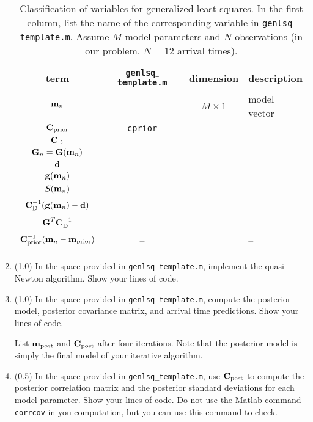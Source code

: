 \documentclass[11pt,titlepage,fleqn]{article}
\begin{document}
\begin{enumerate}
\begin{enumerate}
\end{enumerate}

\begin{table}
\centering
\caption[]{{
Classification of variables for generalized least squares. In the first column, list the name of the corresponding variable in {\tt genlsq$\_$template.m}. Assume $M$ model parameters and $N$ observations (in our problem, $N=12$ arrival times).
\label{tab:vars}
}}
\begin{tabular}{c|c|c|l}
\hline
term & {\tt genlsq$\_$template.m} & dimension & description \hspace{2cm} \\
\hline\hline 
$\mbox{${\bf m}$}_n$ & -- & $M \times 1$ & model vector \\ \hline
$\mbox{${\bf C}$}_{\rm prior}$ & \verb+cprior+ & & \\ \hline
$\mbox{${\bf C}$}_{\rm D}$ & & & \\ \hline
$\mbox{${\bf G}$}_n = \mbox{${\bf G}$}(\mbox{${\bf m}$}_n)$ & & & \\ \hline
$\mbox{${\bf d}$}$ & & & \\ \hline
$\mbox{${\bf g}$}(\mbox{${\bf m}$}_n)$ & & & \\ \hline\hline
$S(\mbox{${\bf m}$}_n)$ & & & \\ \hline
$\mbox{${\bf C}$}_{\rm D}^{-1} (\mbox{${\bf g}$}(\mbox{${\bf m}$}_n) - \mbox{${\bf d}$})$ & -- & & -- \\ \hline
$\mbox{${\bf G}$}^T\mbox{${\bf C}$}_{\rm D}^{-1}$ & -- & & -- \\ \hline
$\mbox{${\bf C}$}_{\rm prior}^{-1} (\mbox{${\bf m}$}_n - \mbox{${\bf m}$}_{\rm prior})$ & -- & & -- \\ \hline
\end{tabular}
\end{table}



\item (1.0) In the space provided in \verb+genlsq_template.m+, implement the quasi-Newton algorithm. Show your lines of code.


\item (1.0) In the space provided in \verb+genlsq_template.m+, compute the posterior model, posterior covariance matrix, and arrival time predictions. Show your lines of code.

List $\mbox{${\bf m}$}_{\rm post}$ and $\mbox{${\bf C}$}_{\rm post}$ after four iterations. Note that the posterior model is simply the final model of your iterative algorithm.


\item (0.5) In the space provided in \verb+genlsq_template.m+, use $\mbox{${\bf C}$}_{\rm post}$ to compute the posterior correlation matrix and the posterior standard deviations for each model parameter. Show your lines of code. Do not use the Matlab command \verb+corrcov+ in you computation, but you can use this command to check.


\end{enumerate}
\end{document}
